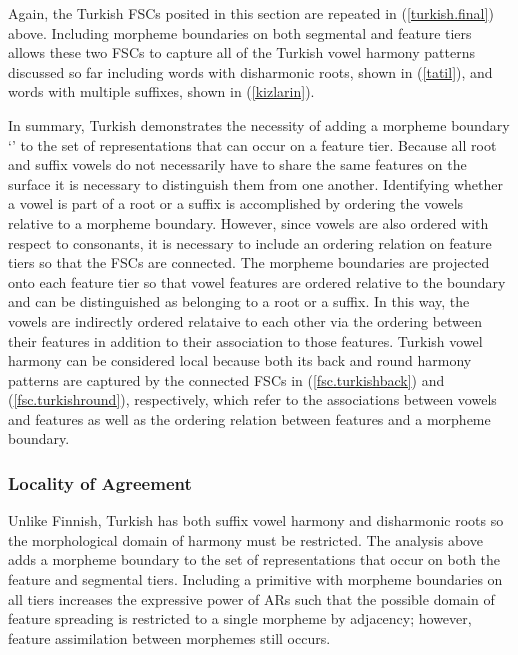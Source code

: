 \documentclass[,doc,floatsintext]{apa6}
\theoremstyle{definition}
\theoremstyle{definition}
\theoremstyle{definition}
\theoremstyle{remark}
\begin{document}
\noindent Again, the Turkish FSCs posited in this section are repeated
in (\ref{turkish.final}) above. Including morpheme boundaries on both
segmental and feature tiers allows these two FSCs to capture all of the
Turkish vowel harmony patterns discussed so far including words with
disharmonic roots, shown in (\ref{tatil}), and words with multiple
suffixes, shown in (\ref{kizlarin}).

In summary, Turkish demonstrates the necessity of adding a morpheme
boundary `\textipa{\LARGE+}' to the set of representations that can
occur on a feature tier. Because all root and suffix vowels do not
necessarily have to share the same features on the surface it is
necessary to distinguish them from one another. Identifying whether a
vowel is part of a root or a suffix is accomplished by ordering the
vowels relative to a morpheme boundary. However, since vowels are also
ordered with respect to consonants, it is necessary to include an
ordering relation on feature tiers so that the FSCs are connected. The
morpheme boundaries are projected onto each feature tier so that vowel
features are ordered relative to the boundary and can be distinguished
as belonging to a root or a suffix. In this way, the vowels are
indirectly ordered relataive to each other via the ordering between
their features in addition to their association to those features.
Turkish vowel harmony can be considered local because both its back and
round harmony patterns are captured by the connected FSCs in
(\ref{fsc.turkishback}) and (\ref{fsc.turkishround}), respectively,
which refer to the associations between vowels and features as well as
the ordering relation between features and a morpheme boundary.

\subsubsection{Locality of Agreement}\label{locality-of-agreement}

Unlike Finnish, Turkish has both suffix vowel harmony and disharmonic
roots so the morphological domain of harmony must be restricted. The
analysis above adds a morpheme boundary to the set of representations
that occur on both the feature and segmental tiers. Including a
primitive with morpheme boundaries on all tiers increases the expressive
power of ARs such that the possible domain of feature spreading is
restricted to a single morpheme by adjacency; however, feature
assimilation between morphemes still occurs.
\end{document}
